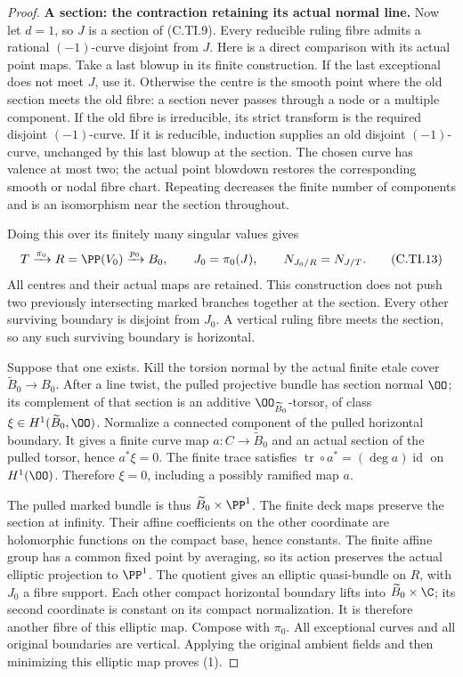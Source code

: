 \begin{proof}
\par\medskip\noindent\textbf{A section: the contraction retaining its actual normal line.}
Now let \(d=1\), so \(J\) is a section
of (C.TI.9). Every reducible ruling
fibre admits a rational \((-1)\)-curve
disjoint from \(J\). Here is a direct
comparison with its actual point maps.
Take a last blowup in its finite
construction. If the last exceptional
does not meet \(J\), use it. Otherwise
the centre is the smooth point where
the old section meets the old fibre:
a section never passes through a
node or a multiple component.
If the old fibre is irreducible,
its strict transform is the required
disjoint \((-1)\)-curve. If it is
reducible, induction supplies an old
disjoint \((-1)\)-curve, unchanged
by this last blowup at the section.
The chosen curve has valence at most
two; the actual point blowdown
restores the corresponding smooth
or nodal fibre chart. Repeating
decreases the finite number of
components and is an isomorphism
near the section throughout.

Doing this over its finitely many
singular values gives
\[
 T\xrightarrow{\pi_0}R=\PP(V_0)
                    \xrightarrow{p_0}B_0,
 \qquad J_0=\pi_0(J),
 \qquad N_{J_0/R}=N_{J/T}.
 \tag{C.TI.13}
\]
All centres and their actual maps
are retained. This construction
does not push two previously
intersecting marked branches
together at the section.
Every other surviving boundary
is disjoint from \(J_0\).
A vertical ruling fibre meets
the section, so any such surviving
boundary is horizontal.

Suppose that one exists. Kill the
torsion normal by the actual finite
etale cover \(\widetilde B_0\to B_0\).
After a line twist, the pulled
projective bundle has section
normal \(\OO\); its complement
of that section is an additive
\(\OO_{\widetilde B_0}\)-torsor,
of class
\(\xi\in H^1(\widetilde B_0,\OO)\).
Normalize a connected component
of the pulled horizontal boundary.
It gives a finite curve map
\(a:C\to\widetilde B_0\) and an
actual section of the pulled
torsor, hence \(a^*\xi=0\).
The finite trace satisfies
\(\operatorname{tr}\circ a^*
 =(\deg a)\operatorname{id}\)
on \(H^1(\OO)\). Therefore
\(\xi=0\), including a possibly
ramified map \(a\).

The pulled marked bundle is thus
\(\widetilde B_0\times\PP^1\).
The finite deck maps preserve the
section at infinity. Their affine
coefficients on the other coordinate
are holomorphic functions on the
compact base, hence constants.
The finite affine group has a
common fixed point by averaging,
so its action preserves the actual
elliptic projection to \(\PP^1\).
The quotient gives an elliptic
quasi-bundle on \(R\), with \(J_0\)
a fibre support. Each other compact
horizontal boundary lifts into
\(\widetilde B_0\times\C\); its
second coordinate is constant
on its compact normalization.
It is therefore another fibre
of this elliptic map. Compose
with \(\pi_0\). All exceptional
curves and all original boundaries
are vertical. Applying the original
ambient fields and then minimizing
this elliptic map proves (1).


\end{proof}
